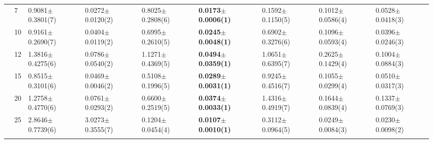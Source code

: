 \begin{table*}[htbp]
\begin{adjustbox}{width=1.0\textwidth,center}
\begin{tabular}{lllllllll}
      & 7                              & 0.9081$\pm$0.3801(7)         & 0.0272$\pm$0.0120(2)          & 0.8025$\pm$0.2808(6)              & \textbf{0.0173$\pm$0.0006(1)} & 0.1592$\pm$0.1150(5)                              & 0.1012$\pm$0.0586(4)                     & 0.0528$\pm$0.0418(3)          \\
      & 10                             & 0.9161$\pm$0.2690(7)         & 0.0404$\pm$0.0119(2)          & 0.6995$\pm$0.2610(5)              & \textbf{0.0245$\pm$0.0048(1)} & 0.6902$\pm$0.3276(6)                              & 0.1096$\pm$0.0593(4)                     & 0.0396$\pm$0.0246(3)          \\
      & 12                             & 1.3816$\pm$0.4275(6)         & 0.0786$\pm$0.0540(2)          & 1.1271$\pm$0.4369(5)              & \textbf{0.0494$\pm$0.0359(1)} & 1.0651$\pm$0.6395(7)                              & 0.2625$\pm$0.1429(4)                     & 0.1004$\pm$0.0884(3)          \\
      & 15                             & 0.8515$\pm$0.3101(6)         & 0.0469$\pm$0.0046(2)          & 0.5108$\pm$0.1996(5)              & \textbf{0.0289$\pm$0.0031(1)} & 0.9245$\pm$0.4516(7)                              & 0.1055$\pm$0.0299(4)                     & 0.0510$\pm$0.0317(3)          \\
      & 20                             & 1.2758$\pm$0.4770(6)         & 0.0761$\pm$0.0293(2)          & 0.6600$\pm$0.2519(5)              & \textbf{0.0374$\pm$0.0033(1)} & 1.4316$\pm$0.4919(7)                              & 0.1644$\pm$0.0839(4)                     & 0.1337$\pm$0.0769(3)          \\
      & 25                             & 2.8646$\pm$0.7739(6)         & 3.0273$\pm$0.3555(7)          & 0.1204$\pm$0.0454(4)              & \textbf{0.0107$\pm$0.0010(1)} & 0.3112$\pm$0.0964(5)                              & 0.0249$\pm$0.0084(3)                     & 0.0230$\pm$0.0098(2)          \\\thickhline

\end{tabular}
\end{adjustbox}
\end{table*}

